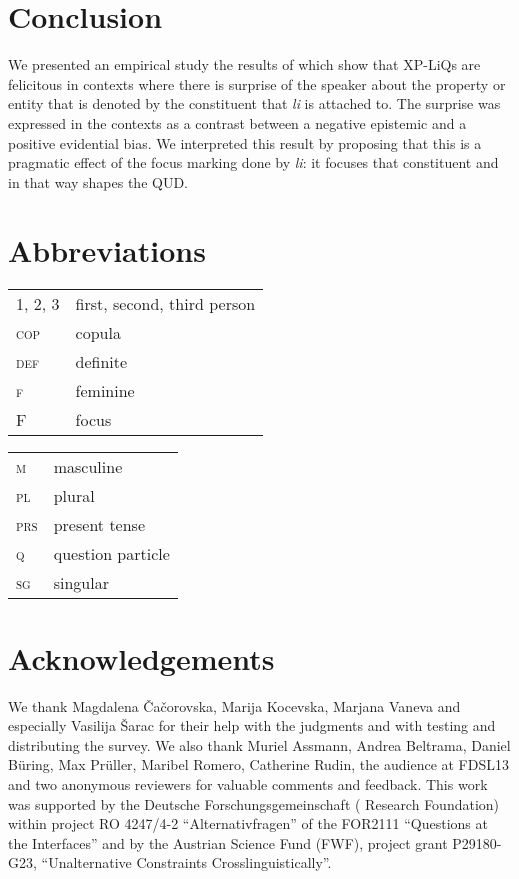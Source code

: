 \documentclass[output=paper,
colorlinks,
citecolor=brown,
newtxmath
]{langscibook}
\begin{document}

\section{Conclusion}\label{sec:conclusion}

We presented an empirical study the results of which show that XP-LiQs are felicitous in contexts where there is surprise of the speaker about the property or entity that is denoted by the constituent that \textit{li} is attached to. The surprise was expressed in the contexts as a contrast between a negative epistemic and a positive evidential bias. We interpreted this result by proposing that this is a pragmatic effect of the focus marking done by \textit{li}: it focuses that constituent and in that way shapes the QUD.

\section*{Abbreviations}

\begin{tabularx}{.5\textwidth}{@{}lX@{}}
\textsc{1, 2, 3}&first, second, third person\\
\textsc{cop}&{copula}\\
\textsc{def}&{definite}\\
\textsc{f}&{feminine}\\
\textsc{F}&{focus}\\
\end{tabularx}%
\begin{tabularx}{.5\textwidth}{@{}lX@{}}
\textsc{m}&{masculine}\\
\textsc{pl}&{plural}\\
\textsc{prs}&{present tense}\\
\textsc{q}&{question particle}\\
\textsc{sg}&singular\\
\end{tabularx}

\section*{Acknowledgements}

We thank Magdalena Čačorovska, Marija Kocevska, Marjana Vaneva and especially Vasilija Šarac for their help with the  judgments and with testing and distributing the survey. We also thank Muriel Assmann, Andrea Beltrama, Daniel Büring, Max Prüller, Maribel Romero, Catherine Rudin, the audience at FDSL13 and two anonymous reviewers for valuable comments and feedback. This work was supported by the Deutsche Forschungsgemeinschaft ( Research Foundation) within project RO 4247/4-2 ``Alternativfragen'' of the FOR2111 ``Questions at the Interfaces'' and by the Austrian Science Fund (FWF), project grant P29180-G23, ``Unalternative Constraints Crosslinguistically''.

\sloppy
\printbibliography[heading=subbibliography,notkeyword=this]
\end{document}

